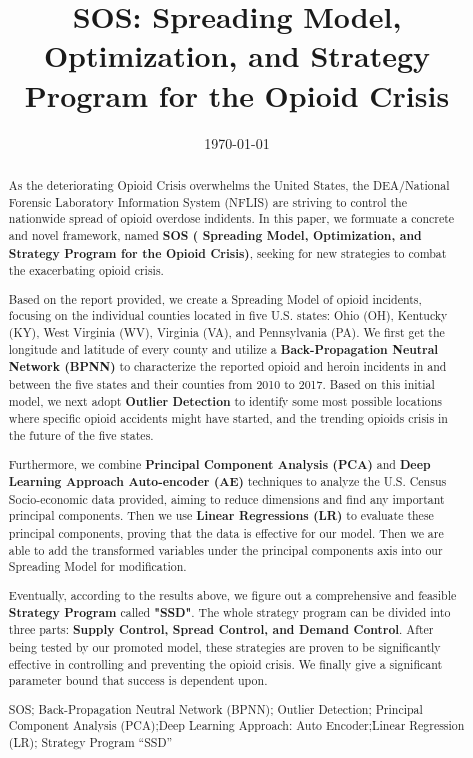 \documentclass{mcmthesis}
\author{}
\begin{document}
\linespread{0.6}  %
\setlength{\parskip}{0.5\baselineskip}  %
\title{SOS: Spreading Model, Optimization, and Strategy Program for the Opioid Crisis}

\date{\today}
\begin{abstract}
	As the deteriorating Opioid Crisis overwhelms the United States, the DEA/National Forensic Laboratory Information System (NFLIS) are striving to control the nationwide spread of opioid overdose indidents. In this paper, we formuate a concrete and novel framework, named \textbf{SOS ( Spreading Model, Optimization, and Strategy Program for the Opioid Crisis)}, seeking for new strategies to combat the exacerbating opioid crisis.
	
	Based on the report provided, we create a Spreading Model of opioid incidents, focusing on the individual counties located in five U.S. states: Ohio (OH), Kentucky (KY), West Virginia (WV), Virginia (VA), and Pennsylvania (PA). We first get the longitude and latitude of every county and utilize a \textbf{Back-Propagation Neutral Network (BPNN)} to characterize the reported opioid and heroin incidents in and between the five states and their counties from 2010 to 2017. Based on this initial model, we next adopt \textbf{Outlier Detection} to identify some most possible locations where specific opioid accidents might have started, and the trending opioids crisis in the future of the five states. 
	
	Furthermore, we combine \textbf{Principal Component Analysis (PCA)} and \textbf{Deep Learning Approach Auto-encoder (AE)} techniques to analyze the U.S. Census Socio-economic data provided, aiming to reduce dimensions and find any important principal components. Then we use \textbf{Linear Regressions (LR)} to evaluate these principal components, proving that the data is effective for our model. Then we are able to add the transformed variables under the principal components axis into our Spreading Model for modification.
	
	Eventually, according to the results above, we figure out a comprehensive and feasible \textbf{Strategy Program} called \textbf{"SSD"}. The whole strategy program can be divided into three parts: \textbf{Supply Control, Spread Control, and Demand Control}. After being tested by our promoted model, these strategies are proven to be significantly effective in controlling and preventing the opioid crisis. We finally give a significant parameter bound that success is dependent upon.
	
	\begin{keywords}
		SOS; Back-Propagation Neutral Network (BPNN); Outlier Detection; Principal Component Analysis (PCA);Deep Learning Approach: Auto Encoder;Linear Regression (LR); Strategy Program ``SSD''
	\end{keywords}
\end{abstract}
\end{document}
